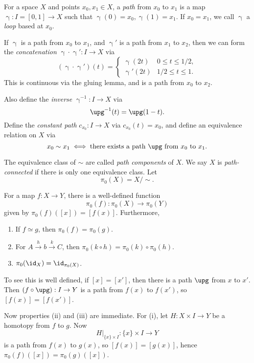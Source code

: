 \documentclass[12pt]{article}
\begin{document}
\begin{definition}
	For a space $X$ and points $x_0, x_1 \in X$, a \emph{path} from $x_0$ to $x_1$ is a map $\upgamma : I = [0, 1] \to X$ such that $\upgamma(0) = x_0, \upgamma(1) = x_1$. If $x_0 = x_1$, we call $\upgamma$ a \emph{loop} based at $x_0$.

	If $\upgamma$ is a path from $x_0$ to $x_1$, and $\upgamma'$ is a path from $x_1$ to $x_2$, then we can form the \emph{concatenation} $\upgamma \cdot \upgamma' : I \to X$ via
	\[
		(\upgamma \cdot \upgamma')(t) =
		\begin{cases}
			\upgamma(2t) & 0 \leq t \leq 1/2,\\
			\upgamma'(2t) & 1/2 \leq t \leq 1.
		\end{cases}
	\]
	This is continuous via the gluing lemma, and is a path from $x_0$ to $x_2$.

	Also define the \emph{inverse} $\upgamma^{-1} : I \to X$ via
	\[
	\upg^{-1}(t) = \upg(1 - t).
	\]
	Define the \emph{constant path} $c_{x_0} : I \to X$ via $c_{x_0}(t) = x_0$, and define an equivalence relation on $X$ via
	\[
		x_0 \sim x_1 \iff \text{there exists a path } \upg \text{ from } x_0 \text{ to } x_1.
	\]
\end{definition}

\begin{definition}
	The equivalence class of $\sim$ are called \emph{path components} of $X$. We say $X$ is \emph{path-connected} if there is only one equivalence class. Let
	\[
	\pi_0(X) = X/\sim.
	\]
\end{definition}

\begin{proposition}
	For a map $f : X \to Y$, there is a well-defined function
	\[
	\pi_0(f) : \pi_0(X) \to \pi_0(Y)
	\]
	given by $\pi_0(f)([x]) = [f(x)]$. Furthermore,
	\begin{enumerate}[\normalfont(i)]
		\item If $f \simeq g$, then $\pi_0(f) = \pi_0(g)$.
		\item For $A \overset{h}{\to} b \overset{k}{\to} C$, then $\pi_0(k \circ h) = \pi_0(k) \circ \pi_0(h)$.
		\item $\pi_0(\id_X) = \id_{\pi_0(X)}$.
	\end{enumerate}
\end{proposition}

\begin{proofbox}
	To see this is well defined, if $[x] = [x']$, then there is a path $\upg$ from $x$ to $x'$. Then $(f \circ \upg) : I \to Y$ is a path from $f(x)$ to $f(x')$, so $[f(x)] = [f(x')]$.

	Now properties (ii) and (iii) are immediate. For (i), let $H : X \times I \to Y$ be a homotopy from $f$ to $g$. Now
	\[
		H|_{\{x\} \times I} : \{x\} \times I \to Y
	\]
	is a path from $f(x)$ to $g(x)$, so $[f(x)] = [g(x)]$, hence $\pi_0(f)([x]) = \pi_0(g)([x])$.
\end{proofbox}
\end{document}
